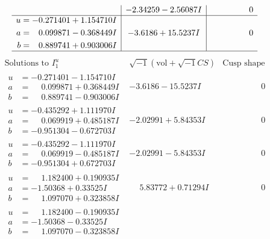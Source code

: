 \documentclass[1p]{elsarticle_modified}
\theoremstyle{definition}
\newcommand{\I}{\sqrt{-1}}
\begin{document}
$$\begin{array}{c|c|c}
 & -2.34259 - 2.56087 I & \phantom{-0.000000 } 0 \\ \hline\begin{aligned}
u &= -0.271401 + 1.154710 I \\
a &= \phantom{-}0.099871 - 0.368449 I \\
b &= \phantom{-}0.889741 + 0.903006 I\end{aligned}
 & -3.6186 + 15.5237 I & \phantom{-0.000000 } 0\\
 \hline 
 \end{array}$$\newpage$$\begin{array}{c|c|c}  
\text{Solutions to }I^u_{1}& \I (\text{vol} + \sqrt{-1}CS) & \text{Cusp shape}\\
 \hline 
\begin{aligned}
u &= -0.271401 - 1.154710 I \\
a &= \phantom{-}0.099871 + 0.368449 I \\
b &= \phantom{-}0.889741 - 0.903006 I\end{aligned}
 & -3.6186 - 15.5237 I & \phantom{-0.000000 } 0 \\ \hline\begin{aligned}
u &= -0.435292 + 1.111970 I \\
a &= \phantom{-}0.069919 + 0.485187 I \\
b &= -0.951304 - 0.672703 I\end{aligned}
 & -2.02991 + 5.84353 I & \phantom{-0.000000 } 0 \\ \hline\begin{aligned}
u &= -0.435292 - 1.111970 I \\
a &= \phantom{-}0.069919 - 0.485187 I \\
b &= -0.951304 + 0.672703 I\end{aligned}
 & -2.02991 - 5.84353 I & \phantom{-0.000000 } 0 \\ \hline\begin{aligned}
u &= \phantom{-}1.182400 + 0.190935 I \\
a &= -1.50368 + 0.33525 I \\
b &= \phantom{-}1.097070 + 0.323858 I\end{aligned}
 & \phantom{-}5.83772 + 0.71294 I & \phantom{-0.000000 } 0 \\ \hline\begin{aligned}
u &= \phantom{-}1.182400 - 0.190935 I \\
a &= -1.50368 - 0.33525 I \\
b &= \phantom{-}1.097070 - 0.323858 I\end{aligned}

\end{array}$$
\end{document}
